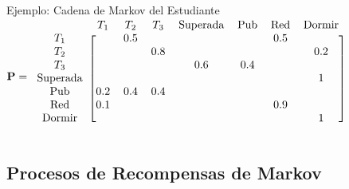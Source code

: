 \documentclass[10pt, envcountsect, handout, aspectratio=1610, hyperref={hypertexnames=true}]{beamer}
\begin{document}
\begin{frame}{Ejemplo: Cadena de Markov del Estudiante}
\hfil{\footnotesize
\(\mathbf{P}=
\begin{blockarray}{cccccccc}
    & T_1 & T_2 & T_3 & \text{Superada} & \text{Pub} & \text{Red} & \text{Dormir} \\
\begin{block}{c[ccccccc]}
T_1      &     & 0.5 &     &            &          &  0.5     &       \\
T_2      &     &     & 0.8 &            &          &          &  0.2  \\
T_3      &     &     &     & 0.6        & 0.4      &          &       \\
\text{Superada} &     &     &     &            &          &          &  1    \\
\text{Pub}      & 0.2 &0.4  & 0.4 &            &          &          &       \\
\text{Red}      & 0.1 &     &     &            &          &  0.9     &       \\
\text{Dormir}    &     &     &     &            &          &          & 1     \\
\end{block}
\end{blockarray}
\)
}

\end{frame}





\subsection{Procesos de Recompensas de Markov}
\end{document}
